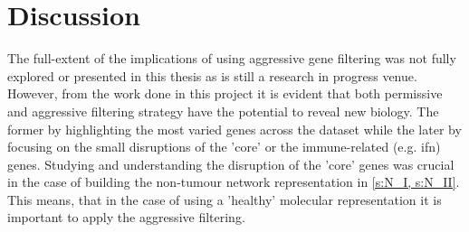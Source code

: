 \chapter{Discussion}


The full-extent of the implications of using aggressive gene filtering was not fully explored or presented in this thesis as is still a research in progress venue. However, from the work done in this project it is evident that both permissive and aggressive filtering strategy have the potential to reveal new biology. The former by highlighting the most varied genes across the dataset while the later by focusing on the small disruptions of the 'core' or the immune-related (e.g. \acrlong{ifn}) genes. Studying and understanding the disruption of the 'core' genes was crucial in the case of building the non-tumour network representation in \cref{s:N_I, s:N_II}. This means, that in the case of using a 'healthy' molecular representation it is important to apply the aggressive filtering.
